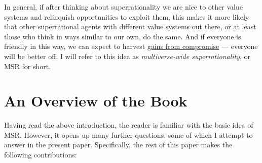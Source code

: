 \documentclass{book}
\begin{document}
In general, if after thinking about superrationality we are nice to other value systems and relinquish opportunities to exploit them, this makes it more likely that other superrational agents with different value systems out there, or at least those who think in ways similar to our own, do the same. And if everyone is friendly in this way, we can expect to harvest \href{https://foundational-research.org/gains-from-trade-through-compromise/}{gains from compromise} --- everyone will be better off. I will refer to this idea as \textit{multiverse-wide superrationality}, or MSR for short.

\section{An Overview of the Book}
\label{Overview}

Having read the above introduction, the reader is familiar with the basic idea of MSR. However, it opens up many further questions, some of which I attempt to answer in the present paper. Specifically, the rest of this paper makes the following contributions:
\end{document}

